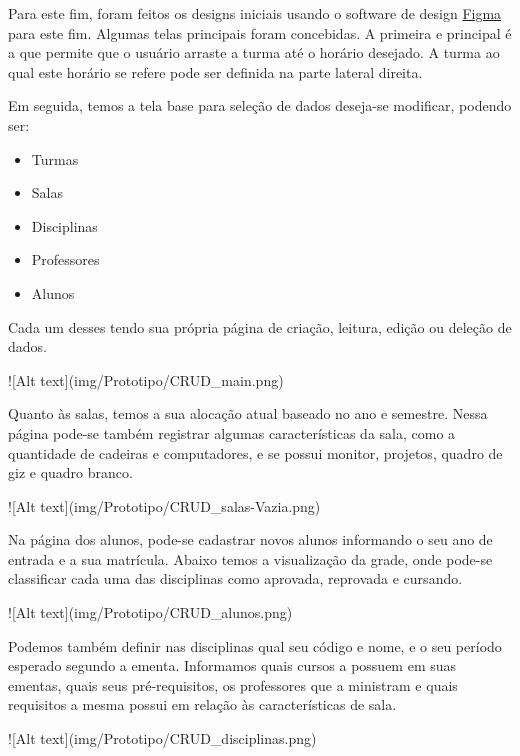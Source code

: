     Para este fim, foram feitos os designs iniciais usando o software de design \href{https://www.figma.com/}{Figma} para este fim. Algumas telas principais foram concebidas. A primeira e principal é a que permite que o usuário arraste a turma até o horário desejado. A turma ao qual este horário se refere pode ser definida na parte lateral direita.


    Em seguida, temos a tela base para seleção de dados deseja-se modificar, podendo ser:

    \begin{itemize}
        \item Turmas
        \item Salas
        \item Disciplinas
        \item Professores
        \item Alunos
    \end{itemize}


    Cada um desses tendo sua própria página de criação, leitura, edição ou deleção de dados.

    ![Alt text](img/Prototipo/CRUD_main.png)

    Quanto às salas, temos a sua alocação atual baseado no ano e semestre. Nessa página pode-se também registrar algumas características da sala, como a quantidade de cadeiras e computadores, e se possui monitor, projetos, quadro de giz e quadro branco.

    ![Alt text](img/Prototipo/CRUD_salas-Vazia.png)

    Na página dos alunos, pode-se cadastrar novos alunos informando o seu ano de entrada e a sua matrícula. Abaixo temos a visualização da grade, onde pode-se classificar cada uma das disciplinas como aprovada, reprovada e cursando.

    ![Alt text](img/Prototipo/CRUD_alunos.png)

    Podemos também definir nas disciplinas qual seu código e nome, e o seu período esperado segundo a ementa. Informamos quais cursos a possuem em suas ementas, quais seus pré-requisitos, os professores que a ministram e quais requisitos a mesma possui em relação às características de sala.

    ![Alt text](img/Prototipo/CRUD_disciplinas.png)

